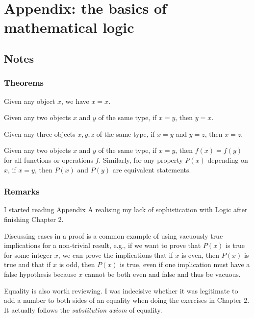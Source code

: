 \section{Appendix: the basics of mathematical logic}
\subsection{Notes}
\subsubsection{Theorems}
\begin{axiom}
    Given any object $x$, we have $x = x$.
\end{axiom}
\begin{axiom}
    Given any two objects $x$ and $y$ of the same
type, if $x = y$, then $y = x$.
\end{axiom}
\begin{axiom}
    Given any three objects $x, y, z$ of the same
type, if $x = y$ and $y = z$, then $x = z$.
\end{axiom}
\begin{axiom}
    Given any two objects $x$ and $y$ of the same type, if $x = y$, then $f(x) = f(y)$ for all functions or operations $f$. Similarly, for any property $P(x)$ depending on $x$, if $x = y$, then $P(x)$ and $P(y)$ are equivalent statements.    
\end{axiom}

\subsubsection{Remarks}
I started reading Appendix A realising my lack of sophistication with Logic after finishing Chapter 2.

Discussing cases in a proof is a common example of using vacuously true implications for a non-trivial result, e.g., if we want to prove that $P(x)$ is true for some integer $x$, we can prove the implications that if $x$ is even, then $P(x)$ is true and that if $x$ is odd, then $P(x)$ is true, even if one implication must have a false hypothesis because $x$ cannot be both even and false and thus be vacuous.

Equality is also worth reviewing. I was indecisive whether it was legitimate to add a number to both sides of an equality when doing the exercises in Chapter 2. It actually follows the \emph{substitution axiom} of equality.

